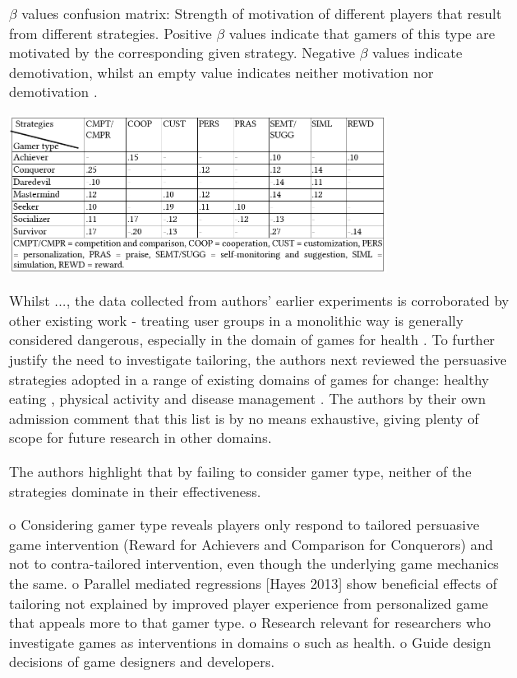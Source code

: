 \documentclass[11pt]{article}
\begin{document}
\begin{table}[H]
\centering
\caption{$\beta$ values confusion matrix: Strength of motivation of different players that result from different strategies. Positive $\beta$ values indicate that gamers of this type are motivated by the corresponding given strategy. Negative $\beta$ values indicate demotivation, whilst an empty value indicates neither motivation nor demotivation \protect\citep{orji2013a}.
}\label{tbl:orji2017-beta-sem}
\includegraphics[width=0.75\textwidth]{img/orji2017-beta-sem.png} 
\end{table}

Whilst 	..., the data collected from authors' earlier experiments is corroborated by other existing work - treating user groups in a monolithic way is generally considered dangerous, especially in the domain of games for health \citep{berkovsky2010}.  To further justify the need to investigate tailoring, the authors next reviewed the persuasive strategies adopted in a range of existing domains of games for change: healthy eating \citep{kaipainen2012, orji2013b}, physical activity \citep{fujiki2008} and disease management \citep{brownson2007}. The authors by their own admission comment that this list is by no means exhaustive, giving plenty of scope for future research in other domains.

The authors highlight that by failing to consider gamer type, neither of the strategies dominate in their effectiveness.

o	Considering gamer type reveals players only respond to tailored persuasive game intervention (Reward for Achievers and Comparison for Conquerors) and not to contra-tailored intervention, even though the underlying game mechanics the same. 
o	Parallel mediated regressions [Hayes 2013] show beneficial effects of tailoring not explained by improved player experience from personalized game that appeals more to that gamer type. 
o	Research relevant for researchers who investigate games as interventions in domains
o	such as health. 
o	Guide design decisions of game designers and developers.
\end{document}
